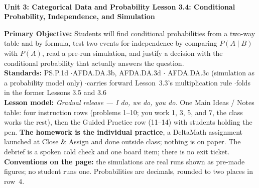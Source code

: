 \documentclass[10pt]{article}
\newcommand{\UnitNumberName}{Unit 3: Categorical Data and Probability \quad}
\newcommand{\LessonNumberName}{Lesson 3.4: Conditional Probability, Independence, and Simulation}
\begin{document}
\begin{center}
    {\Large\bfseries \CourseName \\
    {\small\bfseries \UnitNumberName \LessonNumberName}}
\end{center}

\begin{tcolorbox}[colback=frost, colframe=cerulean, boxrule=0.9pt, arc=2mm,
    left=2mm, right=2mm, top=1.5mm, bottom=1.5mm]
    \textbf{Primary Objective:} Students will find conditional probabilities from a two-way table
    and by formula, test two events for independence by comparing $P(A \mid B)$ with $P(A)$, read a
    pre-run simulation, and justify a decision with the conditional probability that actually
    answers the question.
    \\[2pt]
    \textbf{Standards:} PS.P.1d \quad$\cdot$\quad AFDA.DA.3b, AFDA.DA.3d \quad$\cdot$\quad
    AFDA.DA.3c (simulation as a probability model only) \quad$\cdot$\quad carries forward
    Lesson~3.3's multiplication rule \quad$\cdot$\quad folds in the former Lessons 3.5 and 3.6
    \\[2pt]
    \textbf{Lesson model:} \emph{Gradual release --- I do, we do, you do.} One Main Ideas / Notes
    table: four instruction rows (problems 1--10; you work 1, 3, 5, and 7, the class works the
    rest), then the Guided Practice row (11--14) with students holding the pen. \textbf{The
    homework is the individual practice}, a DeltaMath assignment launched at Close \& Assign and
    done outside class; nothing is on paper. The
    debrief is a spoken cold check and one board item; there is no exit ticket.
    \\[2pt]
    \textbf{Conventions on the page:} the simulations are real runs shown as pre-made figures; no
    student runs one. Probabilities are decimals, rounded to two places in row~4.
\end{tcolorbox}
\end{document}
